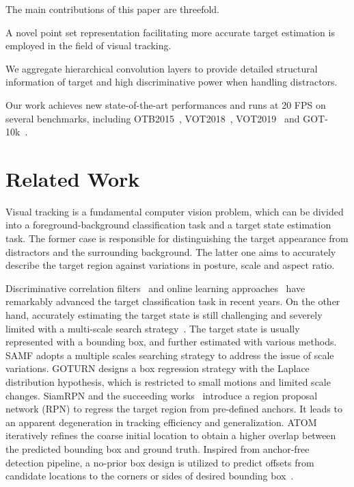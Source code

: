 \documentclass[runningheads]{llncs}
\begin{document}
The main contributions of this paper are threefold.

 A novel point set representation facilitating more accurate target
  estimation is employed in the field of visual tracking.

 We aggregate hierarchical convolution layers to provide detailed
  structural information of target and high discriminative
  power when handling distractors.

 Our work achieves new state-of-the-art performances and runs at 20 FPS
  on several benchmarks, including OTB2015~\cite{OTB2015}, VOT2018~\cite{VOT2018}, VOT2019~\cite{VOT2019} and
  GOT-10k~\cite{GOT-10k}.

\section{Related Work}
Visual tracking is a fundamental computer vision problem, which can be divided into a foreground-background classification task and a target state estimation task. The former case is responsible for distinguishing the target appearance from distractors and the surrounding background. The latter one aims to accurately describe the target region against variations in posture, scale and aspect ratio.

Discriminative correlation filters~\cite{srdcf,csrdcf,drt} and online learning approaches~\cite{atom,drol} have remarkably advanced the target classification task in recent years. On the other hand, accurately estimating the target state is still challenging and severely limited with a multi-scale search strategy~\cite{kcf,eco,siamfc,drt}. The target state is usually represented with a bounding box, and further estimated with various methods. SAMF\cite{li2014a} adopts a multiple scales searching strategy to address the issue of scale variations. GOTURN\cite{goturn} designs a box regression strategy with the Laplace distribution hypothesis, which is restricted to small motions and limited scale changes. SiamRPN and the succeeding works~\cite{siamrpn,siamrpn++,dasiamrpn} introduce a region proposal network (RPN) to regress the target region from pre-defined anchors. It leads to an apparent degeneration in tracking efficiency and generalization. ATOM~\cite{atom} iteratively refines the coarse initial location to obtain a higher overlap between the predicted bounding box and ground truth. Inspired from anchor-free detection pipeline, a no-prior box design is utilized to predict offsets from candidate locations to the corners or sides of desired bounding box~\cite{siamfc++,siamban,siamcar}.
\end{document}
